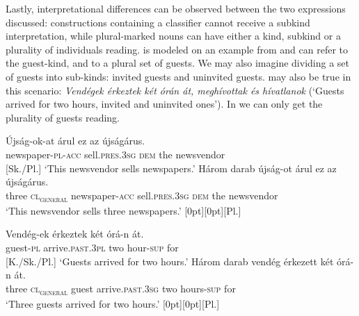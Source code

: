 \documentclass[output=paper]{langscibook}
\begin{document}
\noindent Lastly, interpretational differences can be observed between the two expressions discussed: constructions containing a classifier cannot receive a subkind interpretation, while plural-marked nouns can have either a kind, subkind or a plurality of individuals reading.   is modeled on an example from \citet{landman-rothstein-10} and can refer to the guest-kind, and to a plural set of guests. We may also imagine dividing a set of guests into sub-kinds:  invited guests and uninvited guests.  may also be true in this scenario: \textit{Vendégek érkeztek két órán át, meghívottak és hívatlanok} (`Guests arrived for two hours, invited and uninvited ones'). In  we can only get the plurality of guests reading. 

\ea \label{schv-nem:ex:30}
\ea \label{schv-nem:ex:30a}
\gll Újság-ok-at árul ez az újságárus.\\
newspaper-\textsc{pl}-\textsc{acc} sell.\textsc{pres}.\textsc{3sg} \textsc{dem} the  newsvendor\\ \hfill [Sk./Pl.]
\glt `This newsvendor sells newspapers.'
\ex \label{schv-nem:ex:30b}
\gll Három darab újság-ot árul ez az újságárus.\\
three \textsc{cl\textsubscript{general}} newspaper-\textsc{acc} sell.\textsc{pres}.\textsc{3sg} \textsc{dem} the  newsvendor\\
\glt `This newsvendor sells three newspapers.'   \hfill \raisebox{2.3\baselineskip}[0pt][0pt]{[Pl.]}
\z


\ex \label{schv-nem:ex:31}
\ea \label{schv-nem:ex:31a}
\gll Vendég-ek érkeztek két órá-n át.\\
guest-\textsc{pl} arrive.\textsc{past}.\textsc{3pl} two hour-\textsc{sup} for\\ \hfill [K./Sk./Pl.]
\glt `Guests arrived for two hours.'  \hfill \citep[p.188, (14)]{schvarcz-rothstein-17} 
\ex \label{schv-nem:ex:31b}
\gll Három darab vendég érkezett két órá-n át.\\
three \textsc{cl\textsubscript{general}} guest  arrive.\textsc{past}.\textsc{3sg} two  hours-\textsc{sup} for\\
\glt `Three guests arrived for two hours.'   \hfill \raisebox{2.3\baselineskip}[0pt][0pt]{[Pl.]}
\z
\z
\end{document}
